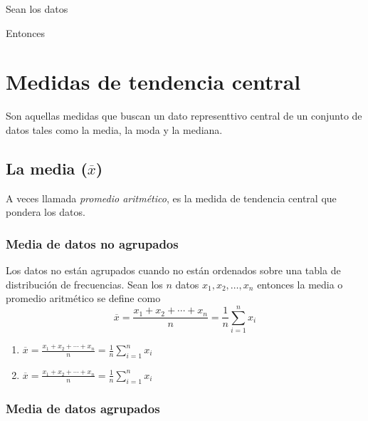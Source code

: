\documentclass[10pt,]{krantz}
\providecommand{\tightlist}{%
  \setlength{\itemsep}{0pt}\setlength{\parskip}{0pt}}
\theoremstyle{definition}
\theoremstyle{definition}
\theoremstyle{definition}
\theoremstyle{remark}
\let\BeginKnitrBlock\begin \let\EndKnitrBlock\end
\begin{document}
\BeginKnitrBlock{exercise}
\protect\hypertarget{exr:unnamed-chunk-1}{}{\label{exr:unnamed-chunk-1} }Sean los datos
\EndKnitrBlock{exercise}

\BeginKnitrBlock{solution}
\iffalse{} {Solución. } \fi{}Entonces
\EndKnitrBlock{solution}

\hypertarget{medidas-de-tendencia-central}{%
\chapter{Medidas de tendencia central}\label{medidas-de-tendencia-central}}

Son aquellas medidas que buscan un dato representtivo central de un conjunto de datos tales como la media, la moda y la mediana.

\hypertarget{la-media-overlinex}{%
\section{\texorpdfstring{La media (\(\overline{x}\))}{La media (\textbackslash{}overline\{x\})}}\label{la-media-overlinex}}

A veces llamada \emph{promedio aritmético}, es la medida de tendencia central que pondera los datos.

\hypertarget{media-de-datos-no-agrupados}{%
\subsection{Media de datos no agrupados}\label{media-de-datos-no-agrupados}}

Los datos no están agrupados cuando no están ordenados sobre una tabla de distribución de frecuencias. Sean los \(n\) datos \(x_1, x_2,\ldots, x_n\) entonces la media o promedio aritmético se define como \[\overline{x}=\frac{x_1+x_2+\cdots+x_n}{n}=\frac{1}{n}\sum_{i=1}^nx_i\]

\begin{enumerate}
\def\labelenumi{\arabic{enumi}.}
\tightlist
\item
  \(\overline{x}=\frac{x_1+x_2+\cdots+x_n}{n}=\frac{1}{n}\sum_{i=1}^nx_i\)
\item
  \(\overline{x}=\frac{x_1+x_2+\cdots+x_n}{n}=\frac{1}{n}\sum_{i=1}^nx_i\)
\end{enumerate}

\hypertarget{media-de-datos-agrupados}{%
\subsection{Media de datos agrupados}\label{media-de-datos-agrupados}}
\end{document}
